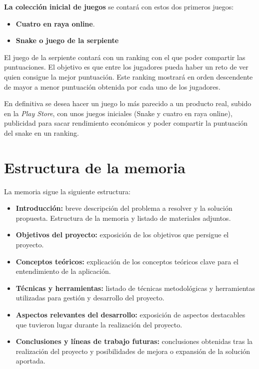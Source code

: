 \textbf{La colección inicial de juegos} se contará con estos dos primeros juegos:
\begin{itemize}
	\item \textbf{Cuatro en raya online}.
	\item \textbf{Snake o juego de la serpiente}
\end{itemize}

El juego de la serpiente contará con un ranking con el que poder compartir las puntuaciones. El objetivo es que entre los jugadores pueda haber un reto de ver quien consigue la mejor puntuación. Este ranking mostrará en orden descendente de mayor a menor puntuación obtenida por cada uno de los jugadores.  

En definitiva se desea hacer un juego lo más parecido a un producto real, subido en la \emph{Play Store}, con unos juegos iniciales (Snake y cuatro en raya online), publicidad para sacar rendimiento económicos y poder compartir la puntuación del snake en un ranking.

\section{Estructura de la memoria}\label{estructura-de-la-memoria}

La memoria sigue la siguiente estructura:

\begin{itemize}
\tightlist
\item
  \textbf{Introducción:} breve descripción del problema a resolver y la
  solución propuesta. Estructura de la memoria y listado de materiales
  adjuntos.
\item
  \textbf{Objetivos del proyecto:} exposición de los objetivos que
  persigue el proyecto.
\item
  \textbf{Conceptos teóricos:} explicación de los conceptos
  teóricos clave para el entendimiento de la aplicación.
\item
  \textbf{Técnicas y herramientas:} listado de técnicas metodológicas y
  herramientas utilizadas para gestión y desarrollo del proyecto.
\item
  \textbf{Aspectos relevantes del desarrollo:} exposición de aspectos
  destacables que tuvieron lugar durante la realización del proyecto.
\item
  \textbf{Conclusiones y líneas de trabajo futuras:} conclusiones
  obtenidas tras la realización del proyecto y posibilidades de mejora o
  expansión de la solución aportada.
\end{itemize}

